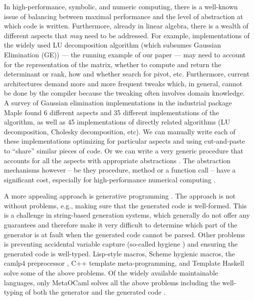 \documentclass[draft]{elsart}
\begin{document}
In high-performance, symbolic, and numeric computing, there is a
well-known issue of balancing between maximal performance and the
level of abstraction at which code is written.  Furthermore, already
in linear algebra, there is a wealth of different aspects that
\emph{may} need to be addressed. For example, implementations of the
widely used LU decomposition algorithm (which subsumes Gaussian 
Elimination (GE)) --- the running
example of our paper --- may need to account for the representation of
the matrix, whether to compute and return the determinant or rank, how
and whether search for pivot, etc. Furthermore, current architectures
demand more and more frequent tweaks which, in general, cannot be done by the
compiler because the tweaking often involves domain knowledge. 
A survey \cite{carette04} of
Gaussian elimination implementations in the industrial package Maple
found 6 different aspects and 35 different implementations of the
algorithm, as well as 45 implementations of directly related
algorithms (LU decomposition, Cholesky decomposition, etc).  We can manually
write each of these implementations optimizing for particular aspects and using
cut-and-paste to ``share'' similar pieces of code.
Or we can write a very generic procedure that accounts for
all the aspects with appropriate abstractions \cite{Axiom}. The
abstraction mechanisms however -- be they procedure, method or a
function call -- have a significant cost, especially for
high-performance numerical computing \cite{carette04}. 

A more appealing approach is generative programming
\cite{Czarnecki,Veldhuizen:1998:ISCOPE,musser94algorithmoriented,BOOST,POOMA,ATLAS}.
The approach is not without problems, e.g., making sure that the
generated code is well-formed. This is a challenge in string-based
generation systems, which generally do not offer any guarantees and
therefore make it very difficult to determine which part of the
generator is at fault when the generated code cannot be parsed. Other
problems is preventing accidental variable capture (so-called hygiene
\cite{HygienicMacros}) and ensuring the generated code is
well-typed. Lisp-style macros, Scheme hygienic macros, the camlp4
preprocessor \cite{camlp4}, C++ template meta-programming, and Template
Haskell \cite{conf/dagstuhl/CzarneckiOST03} solve some of the above
problems. Of the widely available maintainable languages, only
MetaOCaml \cite{CTHL03,metaocaml-org}  solves all the above problems
including the well-typing of both the generator and 
the generated code \cite{TahaSheard97,TahaThesis}.
\end{document}
